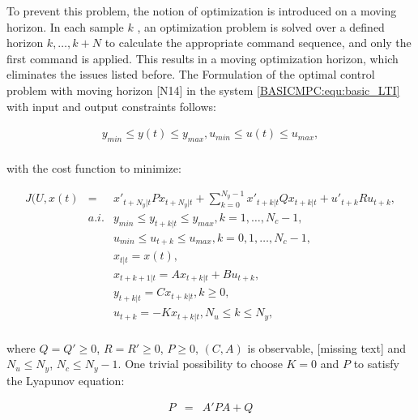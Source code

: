 		To prevent this problem, the notion of optimization is introduced on a moving horizon. In each sample $k$ , an optimization problem is solved over a defined horizon $k,\dots,k+N$ to calculate the appropriate command sequence, and only the first command is applied. This results in a moving optimization horizon, which eliminates the issues listed before. The Formulation of the optimal control problem with moving horizon [N14] in the system \ref{BASICMPC:equ:basic_LTI} with input and output constraints follows:
		
		\begin{equation}
        \begin{array}{c}
				y_{min}\leq y(t)\leq y_{max},u_{min}\leq u(t)\leq u_{max},\\
        \end{array}
        \label{BASICMPC:equ:receiding_horison_constraints}
    \end{equation}
		
		
with the cost function to minimize:
		
		\begin{equation}
        \begin{array}{rcl}
				J(U,x(t)&=&x'_{t+N_y|t}Px_{t+N_y|t}+\sum^{N_y-1}_{k=0}x'_{t+k|t}Qx_{t+k|t}+u'_{t+k}Ru_{t+k},\\
				&a.i.&y_{min}\leq y_{t+k|t}\leq y_{max},k=1,\dots,N_c-1,\\
				&&u_{min}\leq u_{t+k}\leq u_{max},k=0,1,\dots,N_c-1,\\
				&&x_{t|t}=x(t),\\
				&&x_{t+k+1|t}=Ax_{t+k|t}+Bu_{t+k},\\
				&&y_{t+k|t}=Cx_{t+k|t}, k\geq0,\\
				&&u_{t+k}=-Kx_{t+k|t}, N_u\leq k\leq N_y,\\
        \end{array}
        \label{BASICMPC:equ:receiding_horison_problem}
    \end{equation}
		
		where $Q=Q'\geq0$, $R=R'\geq0$, $P\geq0$, $(C,A)$ is observable, [missing text] and $N_u\leq N_y$, $N_c\leq N_y-1$. One trivial possibility to choose $K=0$ and $P$ to satisfy the Lyapunov equation:
		
		\begin{equation}
        \begin{array}{rcl}
				P&=&A'PA+Q\\
        \end{array}
        \label{BASICMPC:equ:receiding_horison_Lyapunov}
    \end{equation}
		
